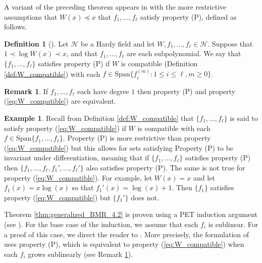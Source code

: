 \documentclass[12pt]{article}
\theoremstyle{plain} %
\theoremstyle{definition} %
\newtheorem{definition}[theorem]{Definition}
\newtheorem{remark}[theorem]{Remark}
\newtheorem{example}[theorem]{Example}
\theoremstyle{plain}
\theoremstyle{plain}
\numberwithin{equation}{section}
\renewcommand{\leq}{\leqslant}
\renewcommand{\geq}{\geqslant}
\newcommand{\1}{\mathbbm{1}}
\begin{document}
A variant of the preceding theorem appears in \cite[Theorem 4.2]{BMR24} with the more restrictive assumptions that $W(x)\preceq x$ that $f_1,\dots, f_{\ell}$ satisfy property (P), defined as follows.


\begin{definition}[\cite{BMR24}]\label{def:property_P}
    Let $\mathcal{H}$ be a Hardy field and let $W,f_1,\dots, f_{\ell}\in \mathcal{H}$. Suppose that $1\prec \log W(x)\prec x$, and that $f_1,\dots, f_{\ell}$ are each subpolynomial. We say that $\{f_1,\dots, f_{\ell}\}$ satisfies property (P) if $W$ is compatible (Definition \ref{def:W_compatible}) with each $f\in \text{Span}\{f_i^{(m)}:1\leq i\leq \ell, m\geq 0\}$.
\end{definition}
\begin{remark}\label{remark:P_WP_star}
    If $f_1,\dots, f_{\ell}$ each have degree $1$ then property (P) and property (\ref{eq:W_compatible}) are equivalent.
\end{remark}

\begin{example} 
Recall from Definition \ref{def:W_compatible} that $\{f_1,\dots, f_{\ell}\}$ is said to satisfy property (\ref{eq:W_compatible}) if $W$ is compatible with each $f\in \text{Span}\{f_1,\dots, f_{\ell}\}$. Property (P) is more restrictive than property (\ref{eq:W_compatible}) but this allows for sets satisfying Property (P) to be invariant under differentiation, meaning that if $\{f_1,\dots, f_{\ell}\}$ satisfies property (P) then $\{f_1,\dots, f_{\ell},f_1',\dots, f_{\ell}'\}$ also satisfies property (P). The same is not true for property (\ref{eq:W_compatible}). For example, let $W(x)=x$ and let $f_1(x) = x\log (x)$ so that $f_1'(x) = \log(x)+1$. Then $\{f_1\}$ satisfies property (\ref{eq:W_compatible}) but $\{f_1'\}$ does not.
\end{example}

Theorem \ref{thm:generalized_BMR_4.2} is proven using a PET induction argument (see \cite{Bergelson_PET}). For the base case of the induction, we assume that each $f_i$ is sublinear. For a proof of this case, we direct the reader to \cite[Theorem 4.3]{BMR24}. More precisely, the formulation of \cite[Theorem 4.3]{BMR24} uses property (P), which is equivalent to property (\ref{eq:W_compatible}) when each $f_i$ grows sublinearly (see Remark \ref{remark:P_WP_star}).
  
\end{document}
